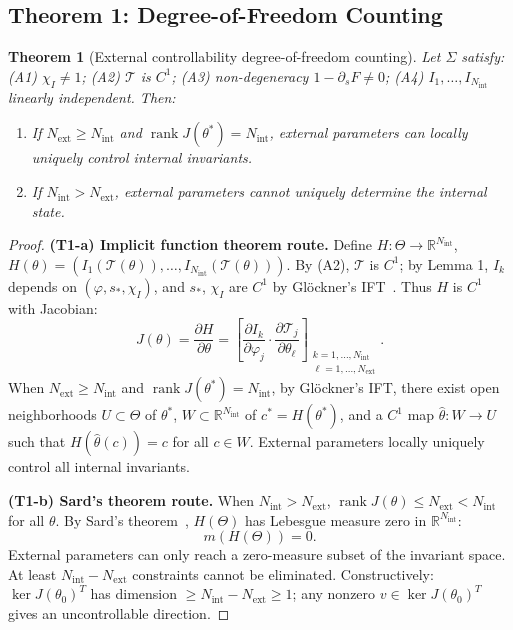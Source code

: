 \documentclass[12pt,a4paper]{article}
\newtheorem{theorem}{Theorem}[section]
\theoremstyle{definition}
\newcommand{\mT}{\mathcal{T}}
\newcommand{\mTheta}{\Theta}
\newcommand{\R}{\mathbb{R}}
\newcommand{\chiI}{\chi_I}
\newcommand{\Nint}{N_{\mathrm{int}}}
\newcommand{\Next}{N_{\mathrm{ext}}}
\newcommand{\rank}{\operatorname{rank}}
\begin{document}
\subsection{Theorem 1: Degree-of-Freedom Counting}

\begin{theorem}[External controllability degree-of-freedom counting]
\label{thm:t1}
Let $\Sigma$ satisfy: (A1) $\chiI \neq 1$; (A2) $\mT$ is $C^1$; (A3) non-degeneracy $1 - \partial_s F \neq 0$; (A4) $I_1, \ldots, I_{\Nint}$ linearly independent. Then:
\begin{enumerate}[label=(T1-\alph*)]
\item If $\Next \geq \Nint$ and $\rank J(\theta^*) = \Nint$, external parameters can locally uniquely control internal invariants.
\item If $\Nint > \Next$, external parameters cannot uniquely determine the internal state.
\end{enumerate}
\end{theorem}

\begin{proof}
\textbf{(T1-a) Implicit function theorem route.}
Define $H: \mTheta \to \R^{\Nint}$, $H(\theta) = (I_1(\mT(\theta)), \ldots, I_{\Nint}(\mT(\theta)))$. By (A2), $\mT$ is $C^1$; by Lemma 1, $I_k$ depends on $(\varphi, s_*, \chiI)$, and $s_*$, $\chiI$ are $C^1$ by Gl\"ockner's IFT~\cite{Glockner2006}. Thus $H$ is $C^1$ with Jacobian:
\begin{equation}
J(\theta) = \frac{\partial H}{\partial \theta} = \left[\frac{\partial I_k}{\partial \varphi_j} \cdot \frac{\partial \mT_j}{\partial \theta_\ell}\right]_{\substack{k=1,\ldots,\Nint \\ \ell=1,\ldots,\Next}}.
\end{equation}
When $\Next \geq \Nint$ and $\rank J(\theta^*) = \Nint$, by Gl\"ockner's IFT, there exist open neighborhoods $U \subset \mTheta$ of $\theta^*$, $W \subset \R^{\Nint}$ of $c^* = H(\theta^*)$, and a $C^1$ map $\hat{\theta}: W \to U$ such that $H(\hat{\theta}(c)) = c$ for all $c \in W$. External parameters locally uniquely control all internal invariants.

\textbf{(T1-b) Sard's theorem route.}
When $\Nint > \Next$, $\rank J(\theta) \leq \Next < \Nint$ for all $\theta$. By Sard's theorem~\cite{Olver1993}, $H(\mTheta)$ has Lebesgue measure zero in $\R^{\Nint}$:
\begin{equation}
m(H(\mTheta)) = 0.
\end{equation}
External parameters can only reach a zero-measure subset of the invariant space. At least $\Nint - \Next$ constraints cannot be eliminated. Constructively: $\ker J(\theta_0)^T$ has dimension $\geq \Nint - \Next \geq 1$; any nonzero $v \in \ker J(\theta_0)^T$ gives an uncontrollable direction.
\end{proof}
\end{document}
